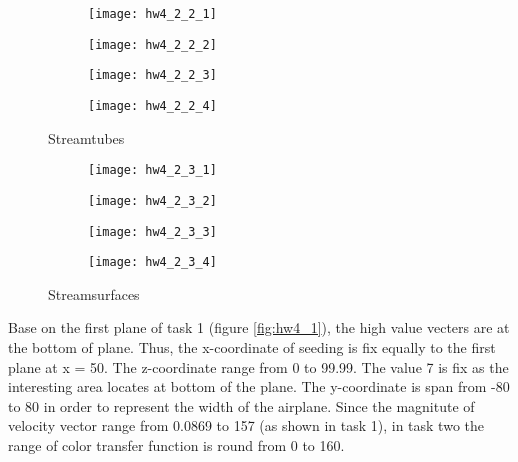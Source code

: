 \documentclass[11pt]{article}
\begin{document}
\begin{figure}[H]
\begin{subfigure}{.5\textwidth}
  \centering
  \texttt{[image: hw4\_2\_2\_1]}
  \caption{}
  \label{fig:hw4_2_2_1}
\end{subfigure}
\begin{subfigure}{.5\textwidth}
  \centering
  \texttt{[image: hw4\_2\_2\_2]}
  \caption{}
  \label{fig:hw4_2_2_2}
\end{subfigure}

\begin{subfigure}{.5\textwidth}
  \centering
  \texttt{[image: hw4\_2\_2\_3]}
  \caption{}
  \label{fig:hw4_2_2_3}
\end{subfigure}
\begin{subfigure}{.5\textwidth}
  \centering
  \texttt{[image: hw4\_2\_2\_4]}
  \caption{}
  \label{fig:hw4_2_2_4}
\end{subfigure}
\caption{Streamtubes}
\label{fig:hw4_2_2}
\end{figure}

\begin{figure}[H]
\begin{subfigure}{.5\textwidth}
  \centering
  \texttt{[image: hw4\_2\_3\_1]}
  \caption{}
  \label{fig:hw4_2_3_1}
\end{subfigure}
\begin{subfigure}{.5\textwidth}
  \centering
  \texttt{[image: hw4\_2\_3\_2]}
  \caption{}
  \label{fig:hw4_2_3_2}
\end{subfigure}

\begin{subfigure}{.5\textwidth}
  \centering
  \texttt{[image: hw4\_2\_3\_3]}
  \caption{}
  \label{fig:hw4_2_3_3}
\end{subfigure}
\begin{subfigure}{.5\textwidth}
  \centering
  \texttt{[image: hw4\_2\_3\_4]}
  \caption{}
  \label{fig:hw4_2_3_4}
\end{subfigure}
\caption{Streamsurfaces}
\label{fig:hw4_2_3}
\end{figure}

Base on the first plane of task 1 (figure \ref{fig:hw4_1}), the high value vecters are at the bottom of plane. 
Thus, the x-coordinate of seeding is fix equally to the first plane at x = 50.
The z-coordinate range from 0 to 99.99. The value 7 is fix as the interesting area locates at bottom of the plane.
The y-coordinate is span from -80 to 80 in order to represent the width of the airplane.
\newline \newline
Since the magnitute of velocity vector range from 0.0869 to 157 (as shown in task 1), in task two the range of color transfer function is round from 0 to 160.
\end{document}
